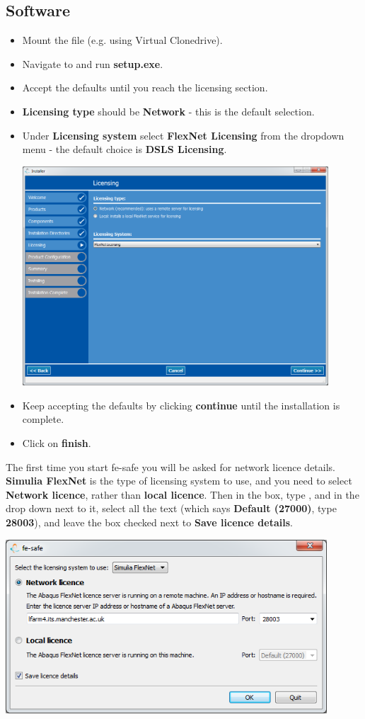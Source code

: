 \documentclass[10pt,a4paper]{article}
\begin{document}
	\subsection{Software}
	\begin{itemize}
		\itemsep0em
		\item Mount the  file (e.g. using Virtual Clonedrive).
		\item Navigate to  and run \textbf{setup.exe}.
		\item Accept the defaults until you reach the licensing section.
		\item \textbf{Licensing type} should be \textbf{Network} - this is the default selection.
		\item Under \textbf{Licensing system} select \textbf{FlexNet Licensing} from the dropdown menu - the default choice is \textbf{DSLS Licensing}.
		
		\includegraphics[width=0.9\textwidth]{fesafe_flexnet}
		
		\item Keep accepting the defaults by clicking \textbf{continue} until the installation is complete.
		\item Click on \textbf{finish}.
	\end{itemize}
			 
		
	The first time you start fe-safe you will be asked for network licence details. \textbf{Simulia FlexNet} is the type of licensing system to use, and you need to select \textbf{Network licence}, rather than \textbf{local licence}. Then in the box, type , and in the drop down next to it, select all the text (which says \textbf{Default (27000)}, type \textbf{28003}), and leave the box checked next to \textbf{Save licence details}.
	
	\medskip
	
	\includegraphics[width=0.9\textwidth]{fesafe_enter_licence_details}
\end{document}
